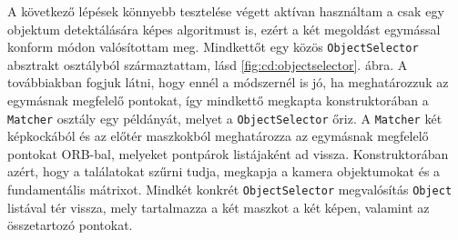 A következő lépések könnyebb tesztelése végett aktívan használtam a csak egy objektum detektálására képes algoritmust is, ezért a két megoldást egymással konform módon valósítottam meg. Mindkettőt egy közös \texttt{ObjectSelector} absztrakt osztályból származtattam, lásd \ref{fig:cd:objectselector}. ábra. A továbbiakban fogjuk látni, hogy ennél a módszernél is jó, ha meghatározzuk az egymásnak megfelelő pontokat, így mindkettő megkapta konstruktorában a \texttt{Matcher} osztály egy példányát, melyet a \texttt{ObjectSelector} őriz. A \texttt{Matcher} két képkockából és az előtér maszkokból meghatározza az egymásnak megfelelő pontokat ORB-bal, melyeket pontpárok listájaként ad vissza. Konstruktorában azért, hogy a találatokat szűrni tudja, megkapja a kamera objektumokat és a fundamentális mátrixot. Mindkét konkrét \texttt{ObjectSelector} megvalósítás \texttt{Object} listával tér vissza, mely tartalmazza a két maszkot a két képen, valamint az összetartozó pontokat.


